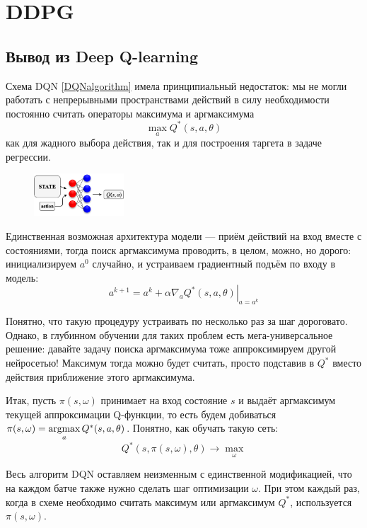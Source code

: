 
\section{DDPG}\label{DDPGsection}

\subsection{Вывод из Deep Q-learning}

Схема DQN \ref{DQNalgorithm} имела принципиальный недостаток: мы не могли работать с непрерывными пространствами действий в силу необходимости постоянно считать операторы максимума и аргмаксимума
$$\max_a Q^*(s, a, \theta)$$
как для жадного выбора действия, так и для построения таргета в задаче регрессии. 

\begin{figure}
\vspace{-0.3cm}
\centering
\includegraphics[width=0.3\textwidth]{Images/Qnetwork1.png}
\vspace{-0.3cm}
\end{figure}

Единственная возможная архитектура модели --- приём действий на вход вместе с состояниями, тогда поиск аргмаксимума проводить, в целом, можно, но дорого: инициализируем $a^0$ случайно, и устраиваем градиентный подъём по входу в модель:
$$a^{k+1} = a^k + \alpha \left. \nabla_a Q^*(s, a, \theta) \right|_{a = a^k}$$

Понятно, что такую процедуру устраивать по несколько раз за шаг дороговато. Однако, в глубинном обучении для таких проблем есть мега-универсальное решение: давайте задачу поиска аргмаксимума тоже аппроксимируем другой нейросетью! Максимум тогда можно будет считать, просто подставив в $Q^*$ вместо действия приближение этого аргмаксимума.

Итак, пусть $\pi(s, \omega)$ принимает на вход состояние $s$ и выдаёт аргмаксимум текущей аппроксимации Q-функции, то есть будем добиваться $\pi(s, \omega) = \mathop{\mathrm{argmax}}\limits_a Q^*(s, a, \theta)$. Понятно, как обучать такую сеть:
$$Q^*(s, \pi(s, \omega), \theta) \to \max_{\omega}$$

Весь алгоритм DQN оставляем неизменным с единственной модификацией, что на каждом батче также нужно сделать шаг оптимизации $\omega$. При этом каждый раз, когда в схеме необходимо считать максимум или аргмаксимум $Q^*$, используется $\pi(s, \omega)$.

